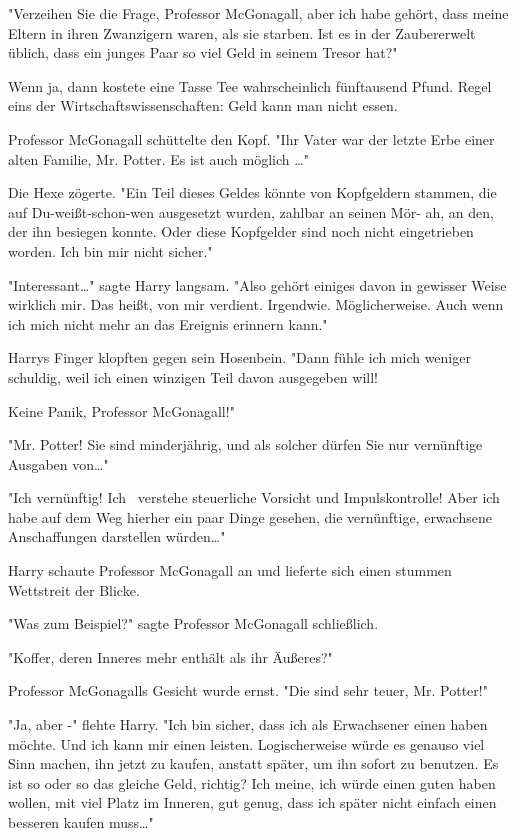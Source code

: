 {"Verzeihen Sie die Frage, Professor McGonagall, aber ich habe gehört, dass meine Eltern in ihren Zwanzigern waren, als sie starben. Ist es in der Zaubererwelt üblich, dass ein junges Paar so viel Geld in seinem Tresor hat?"

Wenn ja, dann kostete eine Tasse Tee wahrscheinlich fünftausend Pfund. Regel eins der Wirtschaftswissenschaften: Geld kann man nicht essen.

Professor McGonagall schüttelte den Kopf. "Ihr Vater war der letzte Erbe einer alten Familie, Mr. Potter. Es ist auch möglich …"

Die Hexe zögerte. "Ein Teil dieses Geldes könnte von Kopfgeldern stammen, die auf Du-weißt-schon-wen ausgesetzt wurden, zahlbar an seinen Mör- ah, an den, der ihn besiegen konnte. Oder diese Kopfgelder sind noch nicht eingetrieben worden. Ich bin mir nicht sicher."

"Interessant…" sagte Harry langsam. "Also gehört einiges davon in gewisser Weise wirklich mir. Das heißt, von mir verdient. Irgendwie. Möglicherweise. Auch wenn ich mich nicht mehr an das Ereignis erinnern kann."

Harrys Finger klopften gegen sein Hosenbein. "Dann fühle ich mich weniger schuldig, weil ich einen winzigen Teil davon ausgegeben will!

Keine Panik, Professor McGonagall!"

"Mr. Potter! Sie sind minderjährig, und als solcher dürfen Sie nur vernünftige Ausgaben von…"

"Ich vernünftig! Ich ~verstehe steuerliche Vorsicht und Impulskontrolle! Aber ich habe auf dem Weg hierher ein paar Dinge gesehen, die vernünftige, erwachsene Anschaffungen darstellen würden…"

Harry schaute Professor McGonagall an und lieferte sich einen stummen Wettstreit der Blicke.

"Was zum Beispiel?" sagte Professor McGonagall schließlich.

"Koffer, deren Inneres mehr enthält als ihr Äußeres?"

Professor McGonagalls Gesicht wurde ernst. "Die sind sehr teuer, Mr. Potter!"

"Ja, aber -" flehte Harry. "Ich bin sicher, dass ich als Erwachsener einen haben möchte. Und ich kann mir einen leisten. Logischerweise würde es genauso viel Sinn machen, ihn jetzt zu kaufen, anstatt später, um ihn sofort zu benutzen. Es ist so oder so das gleiche Geld, richtig? Ich meine, ich würde einen guten haben wollen, mit viel Platz im Inneren, gut genug, dass ich später nicht einfach einen besseren kaufen muss…"

}
